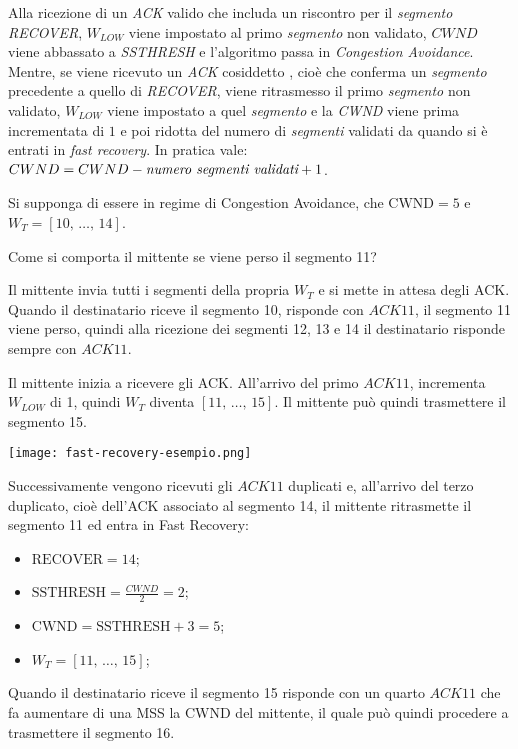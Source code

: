 Alla ricezione di un \emph{ACK} valido che includa un riscontro per il
\emph{segmento RECOVER}, $W_{LOW}$ viene impostato al primo \emph{segmento} non
validato, $CWND$ viene abbassato a \emph{SSTHRESH} e l'algoritmo passa in
\emph{Congestion Avoidance}. Mentre, se viene ricevuto un \emph{ACK} cosiddetto
, cioè che conferma un \emph{segmento} precedente a quello di
\emph{RECOVER}, viene ritrasmesso il primo \emph{segmento} non validato, $W_{LOW}$
viene impostato a quel \emph{segmento} e la \emph{CWND} viene prima incrementata
di $1$ e poi ridotta del numero di \emph{segmenti} validati da quando
si è entrati in \emph{fast recovery}. In pratica vale: $CWND=CWND-\emph{numero
segmenti validati}+1$.

\begin{eg}
    \begin{minipage}{0.48\textwidth}
        Si supponga di essere in regime di Congestion Avoidance, che
        $\text{CWND}=5$ e $W_T=[10,\,\dots,\,14]$.
        
        Come si comporta il mittente se viene perso il segmento 11?

        \bigskip Il mittente invia tutti i segmenti della propria $W_T$ e si
        mette in attesa degli ACK. Quando il destinatario riceve il
        segmento 10, risponde con $ACK11$, il segmento 11 viene
        perso, quindi alla ricezione dei segmenti 12, 13 e 14 il
        destinatario risponde sempre con $ACK11$.

        Il mittente inizia a ricevere gli ACK. All'arrivo del primo
        $ACK11$, incrementa $W_{LOW}$ di 1, quindi $W_T$ diventa $[11,\,\dots,\,15]$.
        Il mittente può quindi trasmettere il segmento 15.
    \end{minipage}
    \hfill
    \begin{minipage}{0.48\textwidth}
        \texttt{[image: fast-recovery-esempio.png]}
    \end{minipage}
    
    \noindent
    Successivamente vengono ricevuti gli $ACK11$ duplicati e, all'arrivo
    del terzo duplicato, cioè dell'ACK associato al segmento 14,
    il mittente ritrasmette il segmento 11 ed entra in Fast Recovery:
    \begin{itemize}
        \item $\text{RECOVER}=14$;
        \item $\text{SSTHRESH}=\frac{CWND}{2}=2$;
        \item $\text{CWND}=\text{SSTHRESH}+3=5$;
        \item $W_T=[11,\,\dots,\,15]$;
    \end{itemize}
    Quando il destinatario riceve il segmento 15 risponde con un quarto
    $ACK11$ che fa aumentare di una MSS la CWND del mittente, il quale può
    quindi procedere a trasmettere il segmento 16.


\end{eg}
